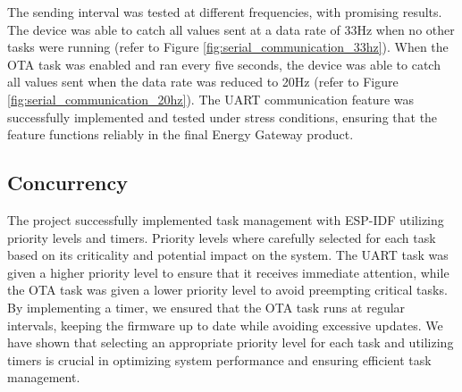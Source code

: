 The sending interval was tested at different frequencies, with promising results. The device was able to catch all values sent at a data rate of 33Hz when no other tasks were running (refer to Figure \ref{fig:serial_communication_33hz}). When the OTA task was enabled and ran every five seconds, the device was able to catch all values sent when the data rate was reduced to 20Hz (refer to Figure \ref{fig:serial_communication_20hz}). The UART communication feature was successfully implemented and tested under stress conditions, ensuring that the feature functions reliably in the final Energy Gateway product.

\subsection{Concurrency}

The project successfully implemented task management with ESP-IDF utilizing priority levels and timers. Priority levels where carefully selected for each task based on its criticality and potential impact on the system. The UART task was given a higher priority level to ensure that it receives immediate attention, while the OTA task was given a lower priority level to avoid preempting critical tasks. By implementing a timer, we ensured that the OTA task runs at regular intervals, keeping the firmware up to date while avoiding excessive updates. We have shown that selecting an appropriate priority level for each task and utilizing timers is crucial in optimizing system performance and ensuring efficient task management.
